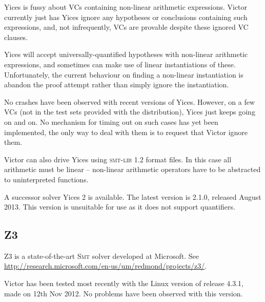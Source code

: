 \documentclass[12pt,fleqn]{article}
\newcommand{\zthree}{\textsc{Z}3}
\newcommand{\yices}{Yices}
\newcommand{\smt}{\textsc{Smt}}
\newcommand{\sri}{\textsc{Sri}}
\newcommand{\smtlib}{\textsc{smt-lib}}
\begin{document}

\yices{} is fussy about VCs containing non-linear arithmetic
expressions.  Victor currently just has \yices{} ignore any hypotheses
or conclusions containing such expressions, and, not infrequently, VCs
are provable despite these ignored VC clauses.  
%

\yices{} will accept universally-quantified hypotheses with non-linear
arithmetic expressions, and sometimes can make use of linear
instantiations of these.
%
Unfortunately, the current behaviour on finding a non-linear
instantiation is abandon the proof attempt rather than simply ignore
the instantiation.  

No crashes have been observed with recent versions of \yices.
However, on a few VCs (not in the test sets provided with the
distribution), \yices{} just keeps going on and on.  No mechanism for
timing out on such cases has yet been implemented, the only way to
deal with them is to request that Victor ignore them.

Victor can also drive Yices using \smtlib{} 1.2 format files. In this
case all arithmetic must be linear -- non-linear arithmetic operators
have to be abstracted to uninterpreted functions.

A successor solver Yices 2 is available.  The latest version is 2.1.0,
released August 2013.  This version is unsuitable for use as it does
not support quantifiers.

\subsection{Z3}

\zthree{} is a state-of-the-art \smt{} solver developed at Microsoft. See
\url{http://research.microsoft.com/en-us/um/redmond/projects/z3/}.

Victor has been tested most recently with the Linux version of release
4.3.1, made on 12th Nov 2012.  No problems have been observed with
this version.

\end{document}
